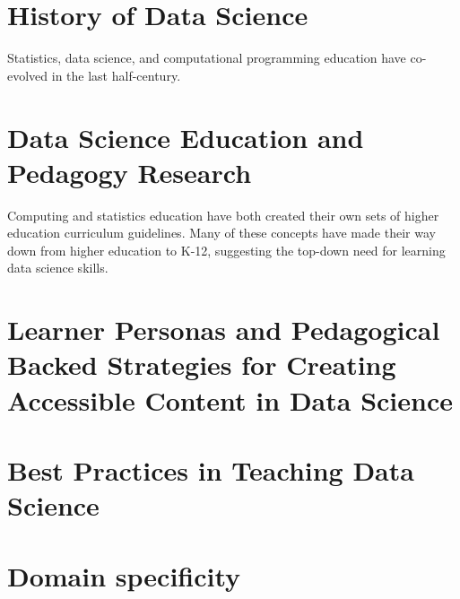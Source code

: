\documentclass[../main.tex]{subfiles}
\begin{document}
    

    \section{History of Data Science}
        \label{se:intro-ds-history}

        Statistics, data science, and computational programming education
        have co-evolved in the last half-century.

        
        
        
        
        

    \section{Data Science Education and Pedagogy Research}
        \label{se:intro-ds-edu-ped}

        Computing and statistics education have both created their own sets of
        higher education curriculum guidelines.
        Many of these concepts have made their way down from higher education to K-12,
        suggesting the top-down need for learning data science skills.

        
        
        

    \section{Learner Personas and Pedagogical Backed Strategies for Creating Accessible Content in Data Science}
        \label{se:intro-personas}

        

    \section{Best Practices in Teaching Data Science}
        \label{se:intro-teaching-best-practices-ds}

        

    \section{Domain specificity}
        \label{se:intro-domain-specificity}
\end{document}
